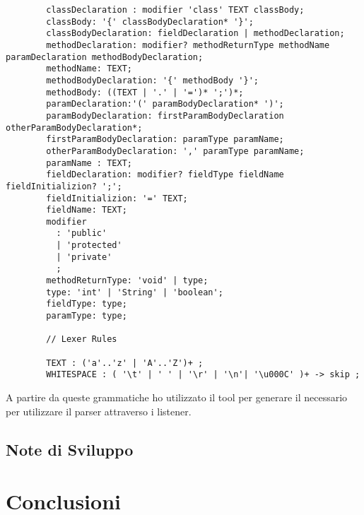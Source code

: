 \documentclass{article}
\begin{document}
\begin{itemize}
\begin{lstlisting}
        classDeclaration : modifier 'class' TEXT classBody;
        classBody: '{' classBodyDeclaration* '}';
        classBodyDeclaration: fieldDeclaration | methodDeclaration;
        methodDeclaration: modifier? methodReturnType methodName paramDeclaration methodBodyDeclaration;
        methodName: TEXT;
        methodBodyDeclaration: '{' methodBody '}';
        methodBody: ((TEXT | '.' | '=')* ';')*;
        paramDeclaration:'(' paramBodyDeclaration* ')';
        paramBodyDeclaration: firstParamBodyDeclaration otherParamBodyDeclaration*;
        firstParamBodyDeclaration: paramType paramName;
        otherParamBodyDeclaration: ',' paramType paramName;
        paramName : TEXT;
        fieldDeclaration: modifier? fieldType fieldName fieldInitializion? ';';
        fieldInitializion: '=' TEXT;
        fieldName: TEXT;
        modifier
          :	'public'
          |	'protected'
          |	'private'
          ;
        methodReturnType: 'void' | type;
        type: 'int' | 'String' | 'boolean';
        fieldType: type;
        paramType: type;

        // Lexer Rules

        TEXT : ('a'..'z' | 'A'..'Z')+ ;
        WHITESPACE : ( '\t' | ' ' | '\r' | '\n'| '\u000C' )+ -> skip ;
      \end{lstlisting}
  \end{itemize}
  A partire da queste grammatiche ho utilizzato il tool per generare il necessario per utilizzare il parser attraverso i listener.





  \subsection{Note di Sviluppo}
  \section{Conclusioni}
\end{document}
